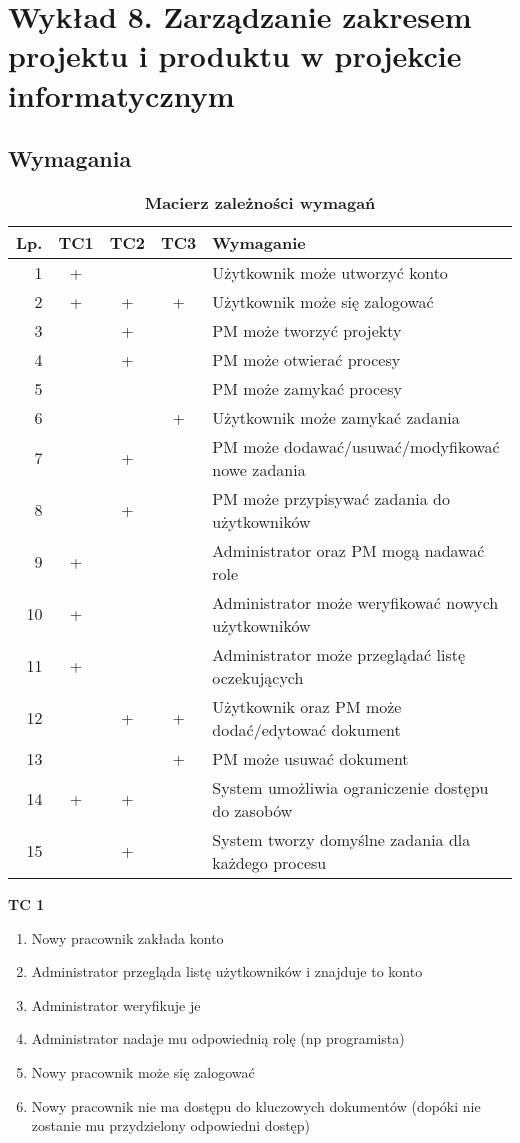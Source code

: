 \chapter{Wykład 8. Zarządzanie zakresem projektu i produktu w projekcie informatycznym}

\section{Wymagania}

\begin{table}[htb]
\centering
\begin{tabular}{r|c c c|p{10.5cm}} 
Lp. & TC1 & TC2 & TC3 & Wymaganie \\
\hline
1 & + &  &  & Użytkownik może utworzyć konto \\
2 & + & + & + & Użytkownik może się zalogować \\
3 &  & + &  & PM może tworzyć projekty \\
4 &  & + &  & PM może otwierać procesy \\
5 &  &  &  & PM może zamykać procesy \\
6 &  &  & + & Użytkownik może zamykać zadania \\
7 &  & + &  & PM może dodawać/usuwać/modyfikować nowe zadania \\
8 &  & + &  & PM może przypisywać zadania do użytkowników \\
9 & + &  &  & Administrator oraz PM mogą nadawać role \\
10 & + &  &  & Administrator może weryfikować nowych użytkowników \\
11 & + &  &  & Administrator może przeglądać listę oczekujących \\
12 &  & + & + & Użytkownik oraz PM może dodać/edytować dokument \\
13 &  &  & + & PM może usuwać dokument \\
14 & + & + &  & System umożliwia ograniczenie dostępu do zasobów \\
15 &  & + &  & System tworzy domyślne zadania dla każdego procesu \\
\end{tabular}
\caption{\textbf{Macierz zależności wymagań}}
\label{tab:macierzWymagan}
\end{table}


\textbf{TC 1}
\begin{enumerate}
\item Nowy pracownik zakłada konto
\item Administrator przegląda listę użytkowników i znajduje to konto
\item Administrator weryfikuje je
\item Administrator nadaje mu odpowiednią rolę (np programista)
\item Nowy pracownik może się zalogować
\item Nowy pracownik nie ma dostępu do kluczowych dokumentów (dopóki nie zostanie mu przydzielony odpowiedni dostęp)
\end{enumerate}


